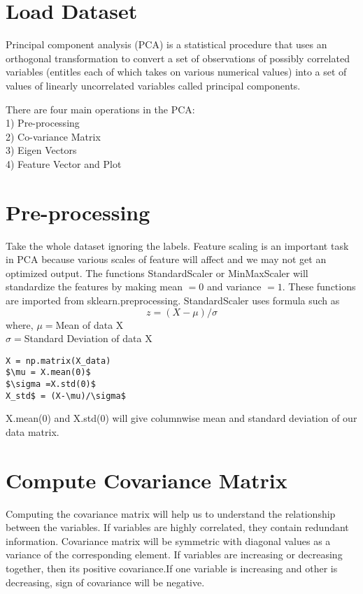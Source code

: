 \documentclass[journal,12pt,twocolumn]{IEEEtran}
\begin{document}
\section{Load Dataset}
Principal component analysis (PCA) is a statistical procedure that uses an orthogonal transformation to convert a set of observations of possibly correlated variables (entitles each of which takes on various numerical values) into a set of values of linearly uncorrelated variables called principal components.


There are four main operations in the PCA:\\
	1) Pre-processing\\
	2) Co-variance Matrix\\
	3) Eigen Vectors\\
	4) Feature Vector and Plot

\section{Pre-processing}
Take the whole dataset ignoring the labels. Feature scaling is an important task in PCA because various scales of feature will affect and we may not get an optimized output. The functions  StandardScaler or MinMaxScaler will standardize the features by making mean $=0$ and variance $=1$. These functions are imported from sklearn.preprocessing. 
StandardScaler uses formula such as 
$$ z = (X-\mu)/\sigma$$
where, $\mu = $Mean of data X\\
$\sigma =$Standard Deviation of data X\\

\begin{lstlisting}[mathescape=true]
X = np.matrix(X_data)
$\mu = X.mean(0)$
$\sigma =X.std(0)$
X_std$ = (X-\mu)/\sigma$
\end{lstlisting}

X.mean(0) and X.std(0) will give columnwise mean and standard deviation of our data matrix.

\section{Compute Covariance Matrix}
Computing the covariance matrix will help us to understand the relationship between the variables. If variables are highly correlated, they contain redundant information. Covariance matrix will be symmetric with diagonal values as a variance of the corresponding element. If variables are increasing or decreasing together, then its positive covariance.If one variable is increasing and other is decreasing, sign of covariance will be negative.
 
\end{document}
